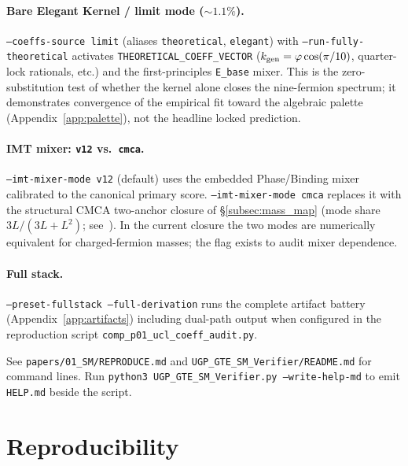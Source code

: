 \documentclass[11pt]{article}
\theoremstyle{remark}
\begin{document}
\begin{appendices}
\paragraph{Bare Elegant Kernel / limit mode ($\sim 1.1\%$).}
\texttt{--coeffs-source limit} (aliases \texttt{theoretical}, \texttt{elegant}) with \texttt{--run-fully-theoretical} activates \texttt{THEORETICAL\_COEFF\_VECTOR} ($k_{\rm gen}=\varphi\cos(\pi/10)$, quarter-lock rationals, etc.) and the first-principles \texttt{E\_base} mixer.
This is the zero-substitution test of whether the kernel alone closes the nine-fermion spectrum; it demonstrates convergence of the empirical fit toward the algebraic palette (Appendix~\ref{app:palette}), not the headline locked prediction.

\paragraph{IMT mixer: \texttt{v12} vs.\ \texttt{cmca}.}
\texttt{--imt-mixer-mode v12} (default) uses the embedded Phase/Binding mixer calibrated to the canonical primary score.
\texttt{--imt-mixer-mode cmca} replaces it with the structural CMCA two-anchor closure of \S\ref{subsec:mass_map} (mode share $3L/(3L+L^2)$; see~\cite{SpivackCMCA,SpivackThreeTapeCMCA}).
In the current closure the two modes are numerically equivalent for charged-fermion masses; the flag exists to audit mixer dependence.

\paragraph{Full stack.}
\texttt{--preset-fullstack --full-derivation} runs the complete artifact battery (Appendix~\ref{app:artifacts}) including dual-path output when configured in the reproduction script \texttt{comp\_p01\_ucl\_coeff\_audit.py}.

See \texttt{papers/01\_SM/REPRODUCE.md} and \texttt{UGP\_GTE\_SM\_Verifier/README.md} for command lines.
Run \texttt{python3 UGP\_GTE\_SM\_Verifier.py --write-help-md} to emit \texttt{HELP.md} beside the script.


\section{Reproducibility}
\label{app:reproduce}


\end{appendices}
\end{document}
